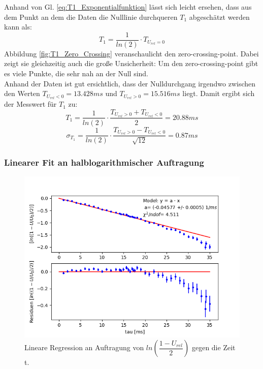 \documentclass[12pt,a4paper]{article}
\begin{document}
Anhand von Gl. \ref{eq:T1_Exponentialfunktion} lässt sich leicht ersehen, dass aus dem Punkt an dem die Daten die Nulllinie durchqueren $T_1$ abgeschätzt werden kann als:
\begin{equation*}
T_1 = \dfrac{1}{ln(2)} \cdot T_{U_{rel} = 0}
\end{equation*}
Abbildung \ref{fig:T1_Zero_Crossing} veranschaulicht den zero-crossing-point. Dabei zeigt sie gleichzeitig auch die große Unsicherheit: Um den zero-crossing-point gibt es viele Punkte, die sehr nah an der Null sind. \\ 
Anhand der Daten ist gut ersichtlich, dass der Nulldurchgang irgendwo zwischen den Werten $T_{U_{rel} < 0} = 13.428ms$ und $T_{U_{rel} > 0} = 15.516ms$ liegt. Damit ergibt sich der Messwert für $T_1$ zu:
\begin{equation*}
T_1 = \dfrac{1}{ln(2)} \cdot \dfrac{T_{U_{rel} > 0} + T_{U_{rel} < 0}}{2} = 20.88 ms
\end{equation*}
\begin{equation*}
\sigma _{T_1} = \dfrac{1}{ln(2)} \cdot \dfrac{T_{U_{rel} > 0} - T_{U_{rel} < 0}}{\sqrt{12}} = 0.87 ms
\end{equation*}

\subsubsection{Linearer Fit an halblogarithmischer Auftragung}

\begin{figure}
\centering
\includegraphics[scale=0.7]{Bilder/T1_linFit_halblog.PNG}
\caption{Lineare Regression an Auftragung von $ln\left(\dfrac{1-U_{rel}}{2}\right)$ gegen die Zeit t.}
\label{fig:T1_linFit}
\end{figure}
\end{document}
